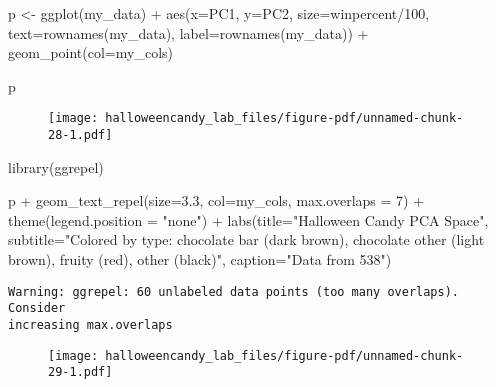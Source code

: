 \documentclass[
  letterpaper,
  DIV=11,
  numbers=noendperiod]{scrartcl}
\newenvironment{Shaded}{\begin{snugshade}}{\end{snugshade}}
\newcommand{\AttributeTok}[1]{\textcolor[rgb]{0.40,0.45,0.13}{#1}}
\newcommand{\DecValTok}[1]{\textcolor[rgb]{0.68,0.00,0.00}{#1}}
\newcommand{\FloatTok}[1]{\textcolor[rgb]{0.68,0.00,0.00}{#1}}
\newcommand{\FunctionTok}[1]{\textcolor[rgb]{0.28,0.35,0.67}{#1}}
\newcommand{\NormalTok}[1]{\textcolor[rgb]{0.00,0.23,0.31}{#1}}
\newcommand{\OtherTok}[1]{\textcolor[rgb]{0.00,0.23,0.31}{#1}}
\newcommand{\SpecialCharTok}[1]{\textcolor[rgb]{0.37,0.37,0.37}{#1}}
\newcommand{\StringTok}[1]{\textcolor[rgb]{0.13,0.47,0.30}{#1}}
\begin{document}
\begin{Shaded}
\begin{Highlighting}[]
\NormalTok{p }\OtherTok{\textless{}{-}} \FunctionTok{ggplot}\NormalTok{(my\_data) }\SpecialCharTok{+} 
        \FunctionTok{aes}\NormalTok{(}\AttributeTok{x=}\NormalTok{PC1, }\AttributeTok{y=}\NormalTok{PC2, }
            \AttributeTok{size=}\NormalTok{winpercent}\SpecialCharTok{/}\DecValTok{100}\NormalTok{,  }
            \AttributeTok{text=}\FunctionTok{rownames}\NormalTok{(my\_data),}
            \AttributeTok{label=}\FunctionTok{rownames}\NormalTok{(my\_data)) }\SpecialCharTok{+}
        \FunctionTok{geom\_point}\NormalTok{(}\AttributeTok{col=}\NormalTok{my\_cols)}

\NormalTok{p}
\end{Highlighting}
\end{Shaded}

\begin{figure}[H]

{\centering \texttt{[image: halloweencandy\_lab\_files/figure-pdf/unnamed-chunk-28-1.pdf]}

}

\end{figure}

\begin{Shaded}
\begin{Highlighting}[]
\FunctionTok{library}\NormalTok{(ggrepel)}

\NormalTok{p }\SpecialCharTok{+} \FunctionTok{geom\_text\_repel}\NormalTok{(}\AttributeTok{size=}\FloatTok{3.3}\NormalTok{, }\AttributeTok{col=}\NormalTok{my\_cols, }\AttributeTok{max.overlaps =} \DecValTok{7}\NormalTok{)  }\SpecialCharTok{+} 
  \FunctionTok{theme}\NormalTok{(}\AttributeTok{legend.position =} \StringTok{"none"}\NormalTok{) }\SpecialCharTok{+}
  \FunctionTok{labs}\NormalTok{(}\AttributeTok{title=}\StringTok{"Halloween Candy PCA Space"}\NormalTok{,}
       \AttributeTok{subtitle=}\StringTok{"Colored by type: chocolate bar (dark brown), chocolate other (light brown), fruity (red), other (black)"}\NormalTok{,}
       \AttributeTok{caption=}\StringTok{"Data from 538"}\NormalTok{)}
\end{Highlighting}
\end{Shaded}

\begin{verbatim}
Warning: ggrepel: 60 unlabeled data points (too many overlaps). Consider
increasing max.overlaps
\end{verbatim}

\begin{figure}[H]

{\centering \texttt{[image: halloweencandy\_lab\_files/figure-pdf/unnamed-chunk-29-1.pdf]}

}

\end{figure}
\end{document}
